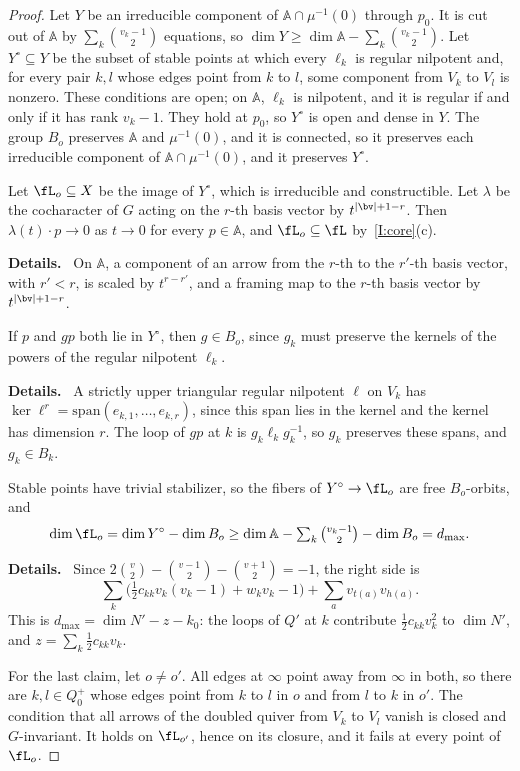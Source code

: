 \documentclass[11pt]{amsart}
\newenvironment{details}{\par\color{black!60!green}\noindent\textbf{Details.}\ }{\par}
\begin{document}
\begin{proof}
Let $Y$ be an irreducible component of $\mathbb A\cap\mu^{-1}(0)$ through
$p_0$.  It is cut out of $\mathbb A$ by $\sum_k\binom{v_k-1}2$ equations, so
$\dim Y\ge\dim\mathbb A-\sum_k\binom{v_k-1}2$.  Let $Y^\circ\subseteq Y$ be the
subset of stable points at which every $\ell_k$ is regular nilpotent and,
for every pair $k,l$ whose edges point from $k$ to $l$, some component from
$V_k$ to $V_l$ is nonzero.  These conditions are open; on $\mathbb A$,
$\ell_k$ is nilpotent, and it is regular if and only if it has rank $v_k-1$.
They hold at $p_0$, so $Y^\circ$ is open and dense in $Y$.  The group $B_o$
preserves $\mathbb A$ and $\mu^{-1}(0)$, and it is connected, so it preserves
each irreducible component of $\mathbb A\cap\mu^{-1}(0)$, and it preserves
$Y^\circ$.

Let $\fL_o\subseteq X$ be the image of $Y^\circ$, which is irreducible and
constructible.  Let $\lambda$ be the cocharacter of $G$ acting on the $r$-th
basis vector by $t^{|\bv|+1-r}$.  Then $\lambda(t)\cdot p\to0$ as $t\to0$ for
every $p\in\mathbb A$, and $\fL_o\subseteq\fL$ by~\ref{I:core}(c).
\begin{details}
On $\mathbb A$, a component of an arrow from
the $r$-th to the $r'$-th basis vector, with $r'<r$, is scaled by
$t^{r-r'}$, and a framing map to the $r$-th basis vector by $t^{|\bv|+1-r}$.
\end{details}

If $p$ and $gp$ both lie in $Y^\circ$, then $g\in B_o$, since $g_k$ must
preserve the kernels of the powers of the regular nilpotent $\ell_k$.
\begin{details}
A strictly
upper triangular regular nilpotent $\ell$ on $V_k$ has
$\ker\ell^r=\mathrm{span}(e_{k,1},\dots,e_{k,r})$, since this span lies in the
kernel and the kernel has dimension $r$.  The loop of $gp$ at $k$ is
$g_k\ell_kg_k^{-1}$, so $g_k$ preserves these spans, and $g_k\in B_k$.
\end{details}
Stable points have trivial stabilizer, so the fibers of $Y^\circ\to\fL_o$ are
free $B_o$-orbits, and
\[
 \dim\fL_o=\dim Y^\circ-\dim B_o
 \ge\dim\mathbb A-\textstyle\sum_k\binom{v_k-1}2-\dim B_o=d_{\max}.
\]
\begin{details}
Since $2\binom v2-\binom{v-1}2-\binom{v+1}2=-1$, the right side is
\[
 \sum_k\big(\tfrac12c_{kk}v_k(v_k-1)+w_kv_k-1\big)+\sum_av_{t(a)}v_{h(a)}.
\]
This is $d_{\max}=\dim N'-z-k_0$: the loops of $Q'$ at $k$ contribute
$\frac12c_{kk}v_k^2$ to $\dim N'$, and $z=\sum_k\frac12c_{kk}v_k$.
\end{details}

For the last claim, let $o\neq o'$.  All edges at $\infty$ point away from
$\infty$ in both, so there are $k,l\in Q_0^+$ whose edges point from $k$ to
$l$ in $o$ and from $l$ to $k$ in $o'$.  The condition that all arrows of the
doubled quiver from $V_k$ to $V_l$ vanish is closed and $G$-invariant.  It
holds on $\fL_{o'}$, hence on its closure, and it fails at every point of
$\fL_o$.
\end{proof}
\end{document}

